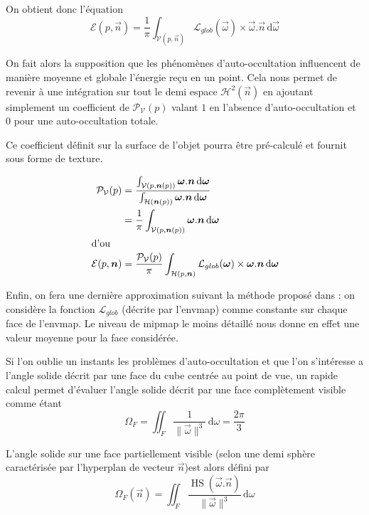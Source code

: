 \documentclass[10pt,a4paper,twoside, twocolumn]{report}
\begin{document}
On obtient donc l'équation
\begin{equation}
	\mathcal E(p, \vec n)=\frac{1}{\pi}\int_{\mathcal V(p, \vec n )}\mathcal L_{glob}(\vec\omega)\times\vec\omega.\vec n\, \mathrm d\vec\omega
\end{equation}

On fait alors la supposition que les phénomènes d'auto-occultation influencent de manière moyenne et globale l'énergie reçu en un point. Cela nous permet de revenir à une intégration sur tout le demi espace $\mathcal H^2(\vec{n})$ en ajoutant simplement un coefficient de $\mathcal P_{\mathcal V}(p)$ valant $1$ en l'absence d'auto-occultation et $0$ pour une auto-occultation totale.

Ce coefficient définit sur la surface de l'objet pourra être pré-calculé et fournit sous forme de texture.

\begin{align}
	\mathcal P_{\mathcal V}(p)	&= \frac{\int_{\mathcal V(p, \vec n(p))}\vec\omega.\vec n\, \mathrm d\vec\omega}{\int_{\mathcal H(\vec n(p))}\vec\omega.\vec n\, \mathrm d\vec\omega}	\notag\\
															&= \frac{1}{\pi}\int_{\mathcal V(p, \vec n(p))}\vec\omega.\vec n\, \mathrm d\vec\omega \\
\intertext{d'ou}
	\mathcal E(p, \vec n)				&= \frac{\mathcal P_{\mathcal V}(p)}{\pi}\int_{\mathcal H(p, \vec n )}\mathcal L_{glob}(\vec\omega)\times\vec\omega.\vec n\, \mathrm d\vec\omega
\end{align}

Enfin, on fera une dernière approximation suivant la méthode proposé dans \cite{Mcguire} : on considère la fonction $\mathcal L_{glob}$ (décrite par l'envmap) comme constante sur chaque face de l'envmap. Le niveau de mipmap le moins détaillé nous donne en effet une valeur moyenne pour la face considérée.


Si l'on oublie un instants les problèmes d'auto-occultation et que l'on s'intéresse a l'angle solide décrit par une face du cube centrée au point de vue, un rapide calcul permet d'évaluer l'angle solide décrit par une face complètement visible comme étant 
\begin{equation}
	\Omega_F = \iint_{F}\frac{1}{\|\vec\omega\|^3}\, \mathrm d\omega = \frac{2\pi}{3}
\end{equation}

L'angle solide sur une face partiellement visible (selon une demi sphère caractérisée par l'hyperplan de vecteur $\vec n$)est alors défini par
\newcommand{\Hs}{\operatorname{HS}}
\begin{equation}
	\Omega_F(\vec n) = \iint_{F}\frac{\Hs(\vec\omega.\vec n)}{\|\vec\omega\|^3}\, \mathrm d\omega
\end{equation}
\end{document}
